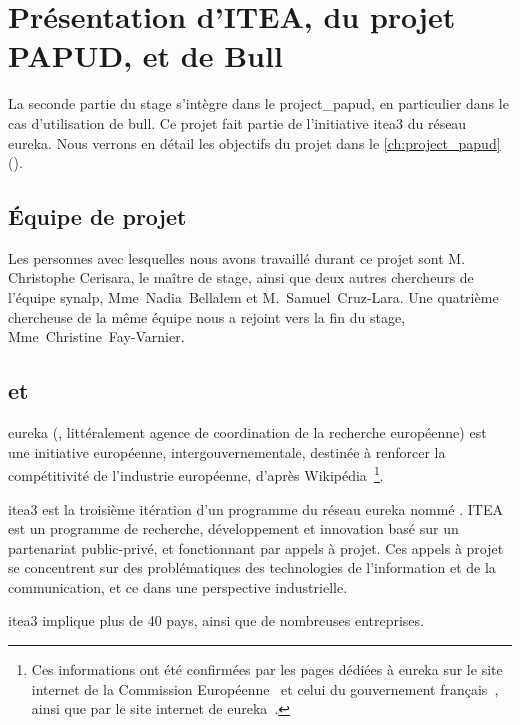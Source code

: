 \chapter{Présentation d'ITEA, du projet PAPUD, et de Bull}
La seconde partie du stage s'intègre dans le \gls{project_papud}, en particulier dans le cas d'utilisation de \gls{bull}. Ce projet fait partie de l'initiative \gls{itea3} du réseau \gls{eureka}.
%
Nous verrons en détail les objectifs du projet dans le \autoref{ch:project_papud} ().


\section{Équipe de projet}\label{sec:papud_colabo}
Les personnes avec lesquelles nous avons travaillé durant ce projet sont M. Christophe Cerisara, le maître de stage, ainsi que deux autres chercheurs de l'équipe \gls{synalp}, \mbox{Mme~Nadia~Bellalem} et \mbox{M.~Samuel~Cruz-Lara}.
Une quatrième chercheuse de la même équipe nous a rejoint vers la fin du stage, \mbox{Mme~Christine~Fay-Varnier}.

\section{ et }
\gls{eureka} (, littéralement \og agence de coordination de la recherche européenne\fg{}) est \og une initiative européenne, intergouvernementale, destinée à renforcer la compétitivité de l’industrie européenne\fg{}, d'après Wikipédia~\autocite{wiki_eureka}\footnote{Ces informations ont été confirmées par les pages dédiées à \gls{eureka} sur le site internet de la Commission Européenne~\autocite{ce_eureka} et celui du gouvernement français~\autocite{fr_eureka}, ainsi que par le site internet de \gls{eureka}~\autocite{eureka}.}.

\gls{itea3} est la troisième itération d'un programme du réseau \gls{eureka} nommé .
ITEA est un programme de recherche, développement et innovation basé sur un partenariat public-privé, et fonctionnant par appels à projet.
Ces appels à projet se concentrent sur des problématiques des technologies de l'information et de la communication, et ce dans une perspective industrielle.

\gls{itea3} implique plus de 40 pays, ainsi que de nombreuses entreprises.

